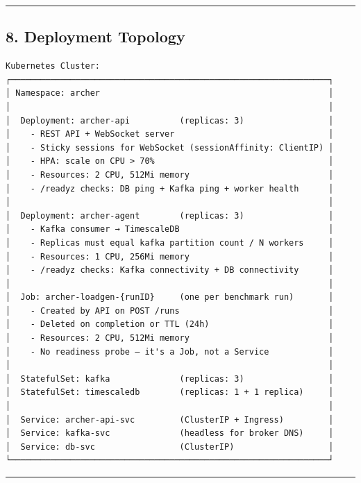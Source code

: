 \documentclass[
]{article}
\begin{document}
\begin{center}\rule{0.5\linewidth}{0.5pt}\end{center}

\hypertarget{deployment-topology}{%
\subsection{8. Deployment Topology}\label{deployment-topology}}

\begin{verbatim}
Kubernetes Cluster:
┌────────────────────────────────────────────────────────────────┐
│ Namespace: archer                                              │
│                                                                │
│  Deployment: archer-api          (replicas: 3)                 │
│    - REST API + WebSocket server                               │
│    - Sticky sessions for WebSocket (sessionAffinity: ClientIP) │
│    - HPA: scale on CPU > 70%                                   │
│    - Resources: 2 CPU, 512Mi memory                            │
│    - /readyz checks: DB ping + Kafka ping + worker health      │
│                                                                │
│  Deployment: archer-agent        (replicas: 3)                 │
│    - Kafka consumer → TimescaleDB                              │
│    - Replicas must equal kafka partition count / N workers     │
│    - Resources: 1 CPU, 256Mi memory                            │
│    - /readyz checks: Kafka connectivity + DB connectivity      │
│                                                                │
│  Job: archer-loadgen-{runID}     (one per benchmark run)       │
│    - Created by API on POST /runs                              │
│    - Deleted on completion or TTL (24h)                        │
│    - Resources: 2 CPU, 512Mi memory                            │
│    - No readiness probe — it's a Job, not a Service            │
│                                                                │
│  StatefulSet: kafka              (replicas: 3)                 │
│  StatefulSet: timescaledb        (replicas: 1 + 1 replica)     │
│                                                                │
│  Service: archer-api-svc         (ClusterIP + Ingress)         │
│  Service: kafka-svc              (headless for broker DNS)     │
│  Service: db-svc                 (ClusterIP)                   │
└────────────────────────────────────────────────────────────────┘
\end{verbatim}

\begin{center}\rule{0.5\linewidth}{0.5pt}\end{center}
\end{document}
